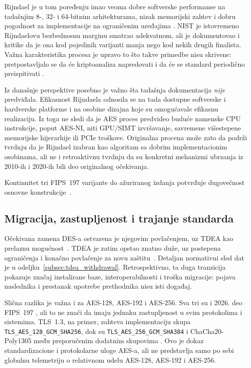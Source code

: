 Rijndael je u tom poređenju imao veoma dobre softverske performanse na
tadašnjim 8-, 32- i 64-bitnim arhitekturama, nizak memorijski zahtev i
dobru pogodnost za implementacije na ograničenim uređajima
\cite{nechvatal2001aes,daemen2002rijndael}. NIST je istovremeno
Rijndaelovu bezbednosnu marginu smatrao adekvatnom, ali je dokumentovao i
kritike da je ona kod pojedinih varijanti manja nego kod nekih drugih
finalista. Važna karakteristika procesa je upravo to što takve primedbe
nisu skrivene: pretpostavljalo se da će kriptoanaliza napredovati i da će
se standard periodično preispitivati \cite{nechvatal2001aes}.

Iz današnje perspektive posebno je važno šta tadašnja dokumentacija
\emph{nije} predviđala. Efikasnost Rijndaela odnosila se na tada dostupne
softverske i hardverske platforme i na osobine dizajna koje su omogućavale
efikasnu realizaciju. Iz toga ne sledi da je AES proces predvideo buduće
namenske CPU instrukcije, poput AES-NI, niti GPU/SIMT izvršavanje,
savremene višestepene memorijske hijerarhije ili PCIe troškove.
Originalna procena može zato da podrži tvrdnju da je Rijndael izabran kao
algoritam sa dobrim implementacionim osobinama, ali ne i retroaktivnu
tvrdnju da su konkretni mehanizmi ubrzanja iz 2010-ih i 2020-ih bili deo
originalnog očekivanja.

Kontinuitet tri FIPS~197 varijante do ažuriranog izdanja potvrđuje
dugovečnost osnovne konstrukcije~\cite{nist_fips197_2001,nist_fips197_2023}.

\subsection{Migracija, zastupljenost i trajanje standarda}

Očekivana zamena DES-a ostvarena je njegovim povlačenjem, uz TDEA kao
prelaznu mogućnost~\cite{federalregister2005des}. TDEA je zatim opstao
znatno duže, uz postepena ograničenja i konačno povlačenje za novu
zaštitu~\cite{nist_sp80067r2,nist_sp800131ar2,nist_tdea_withdrawal_2023}.
Detaljan normativni sled dat je u odeljku~\ref{subsec:tdea_withdrawal}.
Retrospektivno, ta duga tranzicija pokazuje značaj instalirane baze,
interoperabilnosti i troška migracije: pojava naslednika i prestanak
upotrebe prethodnika nisu isti događaj.

Slična razlika je važna i za AES-128, AES-192 i AES-256. Sva tri su i
2026. deo FIPS~197 \cite{nist_fips197_2023}, ali to ne znači da imaju
jednaku zastupljenost u svim protokolima i sistemima. TLS~1.3, na primer,
zahteva implementaciju skupa \texttt{TLS\_AES\_128\_GCM\_SHA256}, dok
su \texttt{TLS\_AES\_256\_GCM\_SHA384} i ChaCha20-Poly1305 među
preporučenim dodatnim skupovima \cite{rfc8446}. Ovo je dokaz
standardizacione i protokolarne uloge AES-a, ali ne predstavlja samo po
sebi globalnu telemetriju o relativnom udelu AES-128, AES-192 i AES-256.

